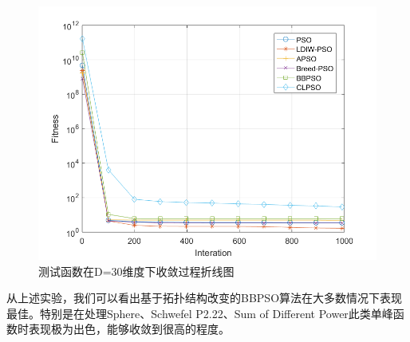 \begin{figure}[htbp]
{\begin{minipage}[b]{0.32\linewidth}
			\includegraphics[width=1\linewidth]{pic/Schwefel2}\vspace{4pt}
	\end{minipage}}
	\caption{测试函数在D=30维度下收敛过程折线图}
\end{figure}
从上述实验，我们可以看出基于拓扑结构改变的BBPSO算法在大多数情况下表现最佳。特别是在处理Sphere、Schwefel P2.22、Sum of Different Power此类单峰函数时表现极为出色，能够收敛到很高的程度。

